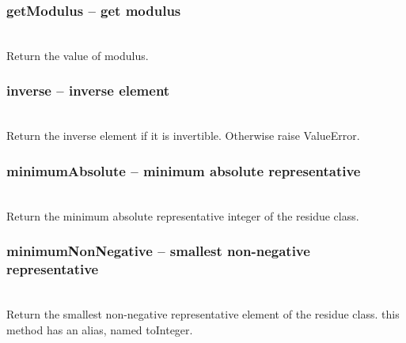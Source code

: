   \subsubsection{getModulus -- get modulus}
   \\
   \spacing
   \quad Return the value of modulus.
%
  \subsubsection{inverse -- inverse element}
   \\
   \spacing
   \quad Return the inverse element if it is invertible. Otherwise raise ValueError.
%
  \subsubsection{minimumAbsolute -- minimum absolute representative}
   \\
   \spacing
   \quad  Return the minimum absolute representative integer of the residue class.
%
  \subsubsection{minimumNonNegative -- smallest non-negative representative}
   \\
   \spacing
   \quad Return the smallest non-negative representative element of the residue class.
   \quad \negok this method has an alias, named toInteger.\\
%
\C
